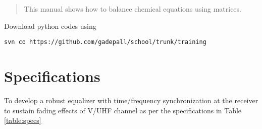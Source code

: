 \documentclass[journal,12pt,twocolumn]{IEEEtran}
\renewcommand\thesection{\arabic{section}}
\begin{document}
%

\begin{abstract}
This manual shows how to balance chemical equations using matrices.
\end{abstract}
Download python codes using 
\begin{lstlisting}
svn co https://github.com/gadepall/school/trunk/training
\end{lstlisting}


\renewcommand{\theequation}{\theenumi}
\section{Specifications}
To develop a robust equalizer with time/frequency synchronization at the receiver to  sustain fading effects of
V/UHF channel as per the  specifications in Table \ref{table:specs}
\begin{table}
\centering

\caption{}
\label{table:specs}
\end{table}
\end{document}
